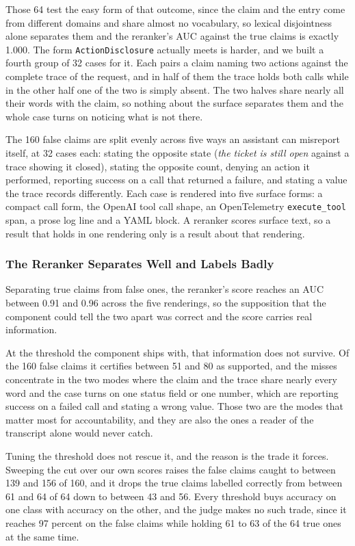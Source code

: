 \documentclass[11pt,a4paper]{article}
\begin{document}
Those 64 test the easy form of that outcome, since the claim and the entry come from
different domains and share almost no vocabulary, so lexical disjointness alone
separates them and the reranker's AUC against the true claims is exactly 1.000. The
form \texttt{ActionDisclosure} actually meets is harder, and we built a fourth group of
32 cases for it. Each pairs a claim naming two actions against the complete trace of
the request, and in half of them the trace holds both calls while in the other half one
of the two is simply absent. The two halves share nearly all their words with the
claim, so nothing about the surface separates them and the whole case turns on
noticing what is not there.

The 160 false claims are split evenly across five ways an assistant can misreport
itself, at 32 cases each: stating the opposite state (\emph{the ticket is still open}
against a trace showing it closed), stating the opposite count, denying an action it
performed, reporting success on a call that returned a failure, and stating a value
the trace records differently. Each case is rendered into five surface forms: a compact
call form, the OpenAI tool call shape, an OpenTelemetry \texttt{execute\_tool} span, a
prose log line and a YAML block. A reranker scores surface text, so a result that holds
in one rendering only is a result about that rendering.

\subsubsection{The Reranker Separates Well and Labels Badly}

Separating true claims from false ones, the reranker's score reaches an AUC between
0.91 and 0.96 across the five renderings, so the supposition that the component could
tell the two apart was correct and the score carries real information.

At the threshold the component ships with, that information does not survive. Of the
160 false claims it certifies between 51 and 80 as supported, and the misses
concentrate in the two modes where the claim and the trace share nearly every word
and the case turns on one status field or one number, which are reporting success on
a failed call and stating a wrong value. Those two are the modes that matter most for
accountability, and they are also the ones a reader of the transcript alone would
never catch.

Tuning the threshold does not rescue it, and the reason is the trade it forces.
Sweeping the cut over our own scores raises the false claims caught to between 139 and
156 of 160, and it drops the true claims labelled correctly from between 61 and 64 of
64 down to between 43 and 56. Every threshold buys accuracy on one class with accuracy
on the other, and the judge makes no such trade, since it reaches 97 percent on the
false claims while holding 61 to 63 of the 64 true ones at the same time.
\end{document}
